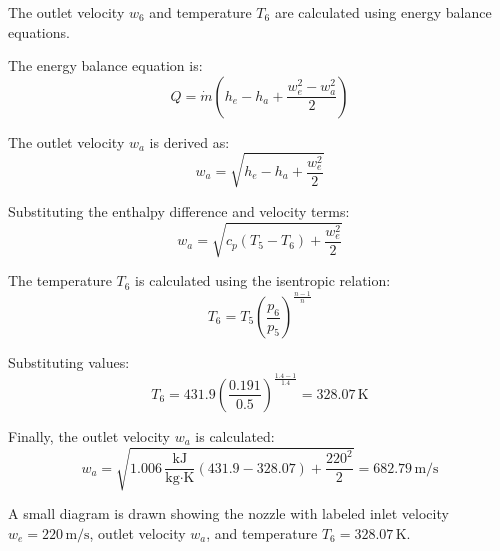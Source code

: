 The outlet velocity \( w_6 \) and temperature \( T_6 \) are calculated using energy balance equations.  

The energy balance equation is:  
\[
Q = \dot{m} \left( h_e - h_a + \frac{w_e^2 - w_a^2}{2} \right)
\]  

The outlet velocity \( w_a \) is derived as:  
\[
w_a = \sqrt{h_e - h_a + \frac{w_e^2}{2}}
\]  

Substituting the enthalpy difference and velocity terms:  
\[
w_a = \sqrt{c_p (T_5 - T_6) + \frac{w_e^2}{2}}
\]  

The temperature \( T_6 \) is calculated using the isentropic relation:  
\[
T_6 = T_5 \left( \frac{p_6}{p_5} \right)^{\frac{n-1}{n}}
\]  

Substituting values:  
\[
T_6 = 431.9 \left( \frac{0.191}{0.5} \right)^{\frac{1.4 - 1}{1.4}} = 328.07 \, \text{K}
\]  

Finally, the outlet velocity \( w_a \) is calculated:  
\[
w_a = \sqrt{1.006 \, \frac{\text{kJ}}{\text{kg·K}} (431.9 - 328.07) + \frac{220^2}{2}} = 682.79 \, \text{m/s}
\]  

A small diagram is drawn showing the nozzle with labeled inlet velocity \( w_e = 220 \, \text{m/s} \), outlet velocity \( w_a \), and temperature \( T_6 = 328.07 \, \text{K} \).